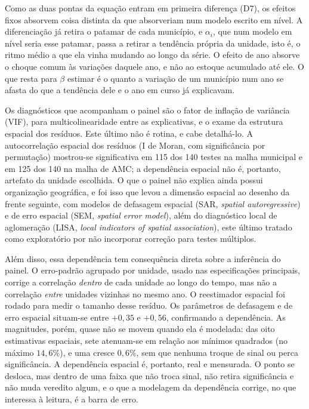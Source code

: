 Como as duas pontas da equação entram em primeira diferença (D7), os efeitos
fixos absorvem coisa distinta da que absorveriam num modelo escrito em nível. A
diferenciação já retira o patamar de cada município, e $\alpha_i$, que num
modelo em nível seria esse patamar, passa a retirar a tendência própria da
unidade, isto é, o ritmo médio a que ela vinha mudando ao longo da série. O
efeito de ano absorve o choque comum às variações daquele ano, e não ao estoque
acumulado até ele. O que resta para $\beta$ estimar é o quanto a variação de um
município num ano se afasta do que a tendência dele e o ano em curso já
explicavam.

Os diagnósticos que acompanham o painel são o fator de inflação de variância
(VIF), para multicolinearidade entre as explicativas, e o exame da estrutura
espacial dos resíduos. Este último não é rotina, e cabe detalhá-lo. A
autocorrelação espacial dos resíduos (I de Moran, com significância por
permutação) mostrou-se significativa em 115 dos 140 testes na malha municipal
e em 125 dos 140 na malha de AMC; a dependência espacial não é, portanto,
artefato da unidade escolhida. O que o painel não explica ainda possui
organização geográfica, e foi isso que levou a dimensão espacial ao desenho da
frente seguinte, com modelos de defasagem espacial (SAR, \emph{spatial
autoregressive}) e de erro espacial (SEM, \emph{spatial error model}), além do
diagnóstico local de aglomeração (LISA, \emph{local indicators of spatial
association}), este último tratado como exploratório por não incorporar
correção para testes múltiplos.

Além disso, essa dependência tem consequência direta sobre a inferência do
painel. O erro-padrão agrupado por unidade, usado nas especificações
principais, corrige a correlação \emph{dentro} de cada unidade ao longo do tempo, mas
não a correlação \emph{entre} unidades vizinhas no mesmo ano. O reestimador espacial
foi rodado para medir o tamanho desse resíduo. Os parâmetros de defasagem e de
erro espacial situam-se entre $+0{,}35$ e $+0{,}56$, confirmando a
dependência. As magnitudes, porém, quase não se movem quando ela é modelada:
das oito estimativas espaciais, sete atenuam-se em relação aos mínimos
quadrados (no máximo $14{,}6\%$), e uma cresce $0{,}6\%$, sem que nenhuma
troque de sinal ou perca significância. A dependência espacial é, portanto,
real e mensurada. O ponto se desloca, mas dentro de uma faixa que não troca
sinal, não retira significância e não muda veredito algum, e o que a modelagem
da dependência corrige, no que interessa à leitura, é a barra de erro.

